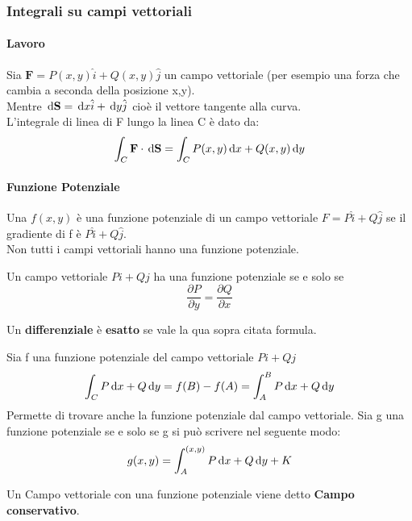 \subsubsection{Integrali su campi vettoriali}
\paragraph{Lavoro}
Sia $\mathbf{F} = P(x,y)\hat{i} + Q(x,y)\hat{j}$ un campo vettoriale (per esempio una forza che cambia a seconda della posizione x,y).\\
Mentre $\,\mathrm{d} \mathbf{S} = \,\mathrm{d} x \hat{i} + \,\mathrm{d} y \hat{j}$ cioè il vettore tangente alla curva.\\
L'integrale di linea di F lungo la linea C è dato da:
\begin{equation*}
	\int_{C} \mathbf{F} \cdot \,\mathrm{d}\mathbf{S} = \int_{C} P(x,y)\,\mathrm{d} x + Q(x,y) \,\mathrm{d} y
\end{equation*}

\paragraph{Funzione Potenziale}
Una $f(x,y)$ è una funzione potenziale di un campo vettoriale $F = P\hat{i} + Q\hat{j}$ se il gradiente di f è $P\hat{i} + Q\hat{j}$. \\
Non tutti i campi vettoriali hanno una funzione potenziale.\\

\begin{teorema}
	Un campo vettoriale $P i+ Qj$ ha una funzione potenziale se e solo se
	\begin{equation*}
		\frac{\partial P}{\partial y} = \frac{\partial Q}{\partial x}
	\end{equation*}
\end{teorema}
Un \textbf{differenziale} è \textbf{esatto} se vale la qua sopra citata formula.
\begin{teorema}
	Sia f una funzione potenziale del campo vettoriale $Pi+Qj$
	\begin{equation}
		\int_{C} P \,\mathrm{d} x + Q \,\mathrm{d} y = f(B)-f(A) = \int_{A}^{B} P\,\mathrm{d} x + Q\,\mathrm{d} y
	\end{equation}
	Permette di trovare anche la funzione potenziale dal campo vettoriale.
	Sia g una funzione potenziale se e solo se g si può scrivere nel seguente modo:
	\begin{equation*}
		g(x,y) = \int_{A}^{(x,y)}P\,\mathrm{d} x + Q \,\mathrm{d} y + K
	\end{equation*}
\end{teorema}
Un Campo vettoriale con una funzione potenziale viene detto \textbf{Campo conservativo}.\\
